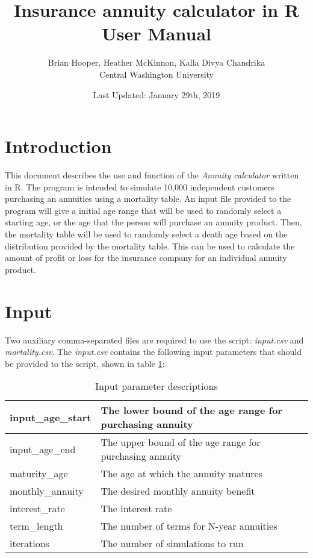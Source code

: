 \documentclass[12pt]{article}
\title{\textbf{Insurance annuity calculator in R} \\ User Manual}
\author{Brian Hooper, Heather McKinnon, Kalla Divya Chandrika  \\ Central Washington University}
\date{Last Updated: January 29th, 2019}
\begin{document}
	\maketitle
	
	\section{Introduction}
	This document describes the use and function of the \textit{Annuity calculator} written in R. The program is intended to simulate 10,000 independent customers purchasing an annuities using a mortality table. An input file provided to the program will give a initial age range that will be used to randomly select a starting age, or the age that the person will purchase an annuity product. Then, the mortality table will be used to randomly select a death age based on the distribution provided by the mortality table. This can be used to calculate the amount of profit or loss for the insurance company for an individual annuity product.
	
	\section{Input}
	Two auxiliary comma-separated files are required to use the script: \textit{input.csv} and \textit{mortality.csv}. The \textit{input.csv} contains the following input parameters that should be provided to the script, shown in table \ref{description}: 
\begin{table}[H]
	\centering
	\begin{tabular}{|l|l|}
		\hline
		input\_age\_start & The lower bound of the age range for purchasing annuity \\ \hline
		input\_age\_end & The upper bound of the age range for purchasing annuity \\ \hline
		maturity\_age & The age at which the annuity matures \\ \hline
		monthly\_annuity & The desired monthly annuity benefit \\ \hline
		interest\_rate & The interest rate \\ \hline
		term\_length & The number of terms for N-year annuities \\ \hline
		iterations & The number of simulations to run \\ \hline
	\end{tabular}
	\label{description}
	\caption{Input parameter descriptions}
\end{table}
\end{document}
